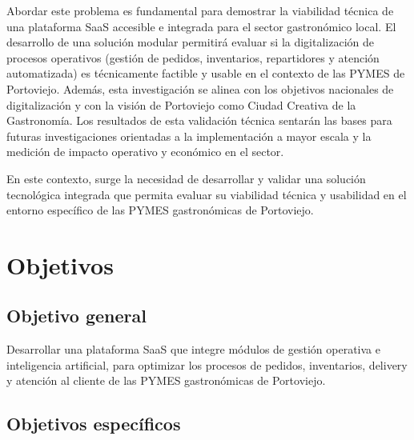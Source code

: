Abordar este problema es fundamental para demostrar la viabilidad técnica de una plataforma SaaS accesible e integrada para el sector gastronómico local. El desarrollo de una solución modular permitirá evaluar si la digitalización de procesos operativos (gestión de pedidos, inventarios, repartidores y atención automatizada) es técnicamente factible y usable en el contexto de las PYMES de Portoviejo. Además, esta investigación se alinea con los objetivos nacionales de digitalización y con la visión de Portoviejo como Ciudad Creativa de la Gastronomía. Los resultados de esta validación técnica sentarán las bases para futuras investigaciones orientadas a la implementación a mayor escala y la medición de impacto operativo y económico en el sector.

En este contexto, surge la necesidad de desarrollar y validar una solución tecnológica integrada que permita evaluar su viabilidad técnica y usabilidad en el entorno específico de las PYMES gastronómicas de Portoviejo.
\section{Objetivos}

\subsection{Objetivo general}

Desarrollar una plataforma SaaS que integre módulos de gestión operativa e inteligencia artificial, para optimizar los procesos de pedidos, inventarios, delivery y atención al cliente de las PYMES gastronómicas de Portoviejo.

\subsection{Objetivos específicos}

